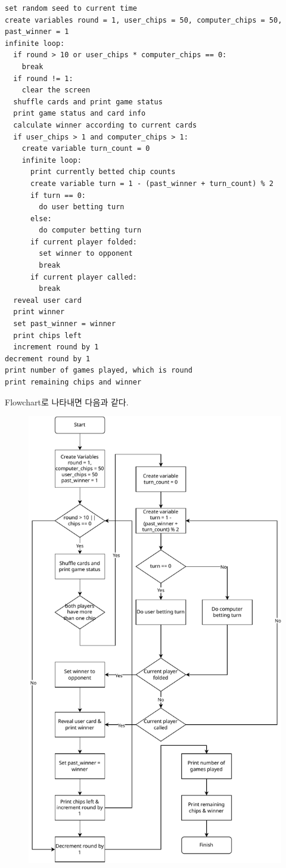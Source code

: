 \documentclass[titlepage]{article}
\begin{document}
\begin{lstlisting}
set random seed to current time
create variables round = 1, user_chips = 50, computer_chips = 50, past_winner = 1
infinite loop:
  if round > 10 or user_chips * computer_chips == 0:
    break
  if round != 1:
    clear the screen
  shuffle cards and print game status
  print game status and card info
  calculate winner according to current cards
  if user_chips > 1 and computer_chips > 1:
    create variable turn_count = 0
    infinite loop:
      print currently betted chip counts
      create variable turn = 1 - (past_winner + turn_count) % 2
      if turn == 0:
        do user betting turn
      else:
        do computer betting turn
      if current player folded:
        set winner to opponent
        break
      if current player called:
        break
  reveal user card
  print winner
  set past_winner = winner
  print chips left
  increment round by 1
decrement round by 1
print number of games played, which is round
print remaining chips and winner
\end{lstlisting}

Flowchart로 나타내면 다음과 같다.

\begin{figure}[H]
  \centering
  \includegraphics[width=0.7\linewidth]{flowchart.drawio.pdf}
\end{figure}
\end{document}
